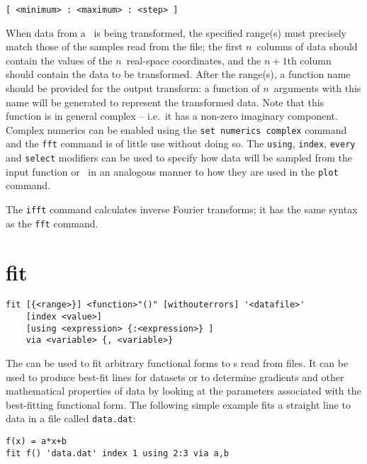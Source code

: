\begin{verbatim}
[ <minimum> : <maximum> : <step> ]
\end{verbatim}

When data from a \datafile\ is being transformed, the specified range(s) must
precisely match those of the samples read from the file; the first $n$~columns
of data should contain the values of the $n$~real-space coordinates, and the
$n+1$th column should contain the data to be transformed.  After the range(s),
a function name should be provided for the output transform: a function of
$n$~arguments with this name will be generated to represent the transformed
data.  Note that this function is in general complex -- i.e.\ it has a non-zero
imaginary component. Complex numerics can be enabled using the {\tt set
numerics complex} command and the {\tt fft} command is of little use without
doing so. The {\tt using}, {\tt index}, {\tt every} and {\tt select} modifiers
can be used to specify how data will be sampled from the input function or
\datafile\ in an analogous manner to how they are used in the {\tt plot}
command.

The {\tt ifft} command calculates inverse Fourier transforms; it has the same
syntax as the {\tt fft} command.

\section{fit}

\begin{verbatim}
fit [{<range>}] <function>"()" [withouterrors] '<datafile>'
    [index <value>]
    [using <expression> {:<expression>} ]
    via <variable> {, <variable>}
\end{verbatim}

The  can be used to fit arbitrary functional forms to \datapoint s
read from files. It can be used to produce best-fit lines for datasets or to
determine gradients and other mathematical properties of data by looking at the
parameters associated with the best-fitting functional form.  The following
simple example fits a straight line to data in a file called {\tt data.dat}:

\begin{verbatim}
f(x) = a*x+b
fit f() 'data.dat' index 1 using 2:3 via a,b
\end{verbatim}


